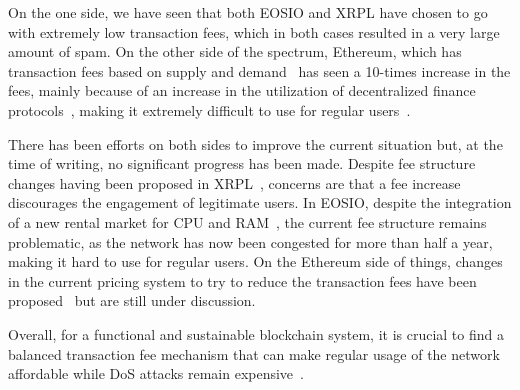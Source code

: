 On the one side, we have seen that both EOSIO and XRPL have chosen to go with extremely low transaction fees, which in both cases resulted in a very large amount of spam.
On the other side of the spectrum, Ethereum, which has transaction fees based on supply and demand~\cite{wood2014} has seen a 10-times increase in the fees, mainly because of an increase in the utilization of decentralized finance protocols~\cite{gudgeon2020decentralized}, making it extremely difficult to use for regular users~\cite{eth-defi-gas}.

There has been efforts on both sides to improve the current situation but, at the time of writing, no significant progress has been made.
Despite fee structure changes having been proposed in XRPL~\cite{xrp-fees}, concerns are that a fee increase discourages the engagement of legitimate users.
In EOSIO, despite the integration of a new rental market for CPU and RAM~\cite{eos-rental-market}, the current fee structure remains problematic, as the network has now been congested for more than half a year, making it hard to use for regular users.
On the Ethereum side of things, changes in the current pricing system to try to reduce the transaction fees have been proposed~\cite{eip-1559} but are still under discussion.

Overall, for a functional and sustainable blockchain system, it is crucial to find a balanced transaction fee mechanism that can make regular usage of the network affordable while DoS attacks remain expensive~\cite{dblp:conf/ndss/0002l20}.
